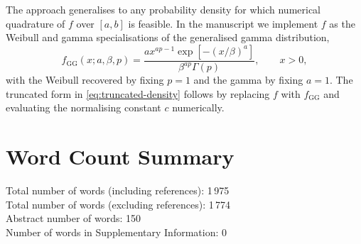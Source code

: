 \documentclass[12pt]{article}
\begin{document}
The approach generalises to any probability density for which numerical quadrature of $f$ over $[a, b]$ is feasible. In the manuscript we implement $f$ as the Weibull and gamma specialisations of the generalised gamma distribution,
\begin{equation}
  f_{\mathrm{GG}}(x; a, \beta, p) = \frac{a x^{ap - 1} \exp\left[-(x / \beta)^a\right]}{\beta^{ap} \Gamma(p)}, \qquad x > 0,
\end{equation}
with the Weibull recovered by fixing $p = 1$ and the gamma by fixing $a = 1$. The truncated form in \eqref{eq:truncated-density} follows by replacing $f$ with $f_{\mathrm{GG}}$ and evaluating the normalising constant $c$ numerically.


\section*{Word Count Summary}
Total number of words (including references): 1\,975\\
Total number of words (excluding references): 1\,774\\
Abstract number of words: 150\\
Number of words in Supplementary Information: 0



\end{document}
